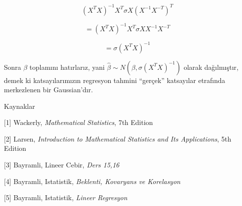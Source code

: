 \documentclass[12pt,fleqn]{article}\usepackage{../../common}
\begin{document}
$$ (X^TX)^{-1}X^T \sigma X(X^{-1}X^{-T})^{T}  $$

$$ = (X^TX)^{-1}X^T \sigma X X^{-1}X^{-T}  $$

$$ = \sigma (X^TX)^{-1}  $$

Sonra $\beta$ toplamını hatırlarız, yani $\hat{\beta} \sim N(\beta, \sigma
(X^TX)^{-1} )$ olarak dağılmıştır, demek ki katsayılarımızın regresyon 
tahmini ``gerçek'' katsayılar etrafında  merkezlenen bir Gaussian'dır.

Kaynaklar

[1] Wackerly, {\em Mathematical Statistics}, 7th Edition

[2] Larsen, {\em Introduction to Mathematical Statistics and Its Applications}, 5th Edition

[3] Bayramli, Lineer Cebir, {\em Ders 15,16}

[4] Bayramli, Istatistik, {\em Beklenti, Kovaryans ve Korelasyon} 

[5] Bayramli, Istatistik, {\em Lineer Regresyon}
\end{document}
